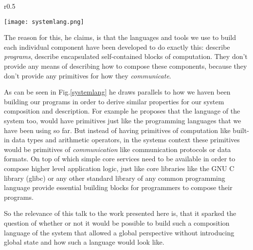 \begin{wrapfigure}{r}{0.5\textwidth}

  \texttt{[image: systemlang.png]}
  \caption{Slide-excerp from the talk ``The Language of the System'' by
          Rich Hickey that draws parallels between the composition of
          (local) programs and distributed systems.}
  \label{systemlang}

\end{wrapfigure}

The reason for this, he claims, is that the languages and tools
we use to build each individual component have been developed to
do exactly this: describe \textit{programs}, describe encapsulated
self-contained blocks of computation. They don't provide any
means of describing how to compose these components, because they
don't provide any primitives for how they \textit{communicate}.

As can be seen in Fig.\ref{systemlang} he draws parallels to how
we haven been building our programs in order to derive similar
properties for our system composition and description. For example
he proposes that the language of the system too, would have
primitives just like the programming languages that we have been
using so far. But instead of having primitives of computation like
built-in data types and arithmetic operators, in the systems context
these primitives would be primitives of \textit{communication} like
communication protocols or data formats. On top of which simple
core services need to be available in order to compose higher
level application logic, just like core libraries like
the GNU C library (glibc) \cite{glibc} or any other standard
library of any common programming language provide essential
building blocks for programmers to compose their programs.
\newline

So the relevance of this talk to the work presented here is, that
it sparked the question of whether or not it would be possible to
build such a composition language of the system that allowed a
global perspective without introducing global state and how such a
language would look like.
\newline

